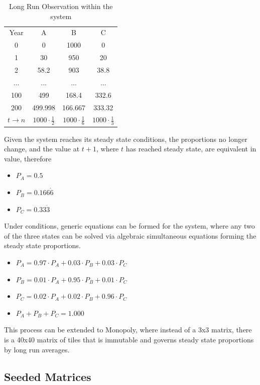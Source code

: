 \documentclass[12pt]{article}
\begin{document}
\begin{table}[h]
\centering
\begin{tabular}{cccc}
Year & A       & B       & C       \\
0    & 0       & 1000    & 0       \\
1    & 30      & 950     & 20      \\
2    & 58.2    & 903     & 38.8    \\
...  & ...     & ...     & ...     \\
100  & 499     & 168.4   & 332.6   \\
200  & 499.998 & 166.667 & 333.32  \\
$t \to n$    & $1000\cdot\frac{1}{2}$     & $1000\cdot\frac{1}{6}$  & $1000\cdot\frac{1}{3}$
\end{tabular}
\caption{Long Run Observation within the system}
\end{table} 

Given the system reaches its steady state conditions, the proportions no longer change, and the value at $t+1$, where $t$ has reached steady state, are equivalent in value, therefore

\begin{itemize}
\item $P_A = 0.5$
\item $P_B = 0.166\dot{6}$
\item $P_C = 0.33\dot{3}$
\end{itemize}

Under conditions, generic equations can be formed for the system, where any two of the three states can be solved via algebraic simultaneous equations forming the steady state proportions.

\begin{itemize}
\item $P_A = 0.97 \cdot P_A + 0.03 \cdot P_B + 0.03 \cdot P_C$
\item $P_B = 0.01 \cdot P_A + 0.95 \cdot P_B + 0.01 \cdot P_C$
\item $P_C = 0.02 \cdot P_A + 0.02 \cdot P_B + 0.96 \cdot P_C$
\item $P_A+P_B+P_C=1.000$
\end{itemize}
This process can be extended to Monopoly, where instead of a 3x3 matrix, there is a 40x40 matrix of tiles that is immutable and governs steady state proportions by long run averages.

\subsection{Seeded Matrices}
\end{document}
